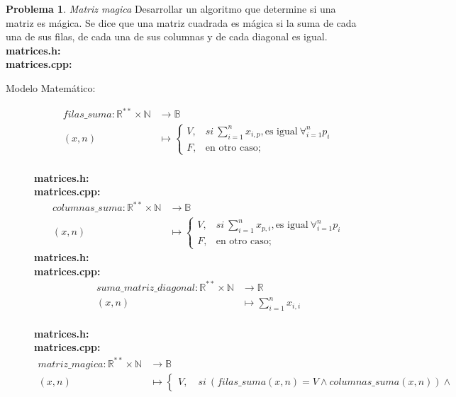 \documentclass{article}
\theoremstyle{plain}
\theoremstyle{definition}
\newtheorem{problem}{Problema}
\begin{document}
\begin{problem} \emph{Matriz magica}
Desarrollar un algoritmo que determine si una matriz es mágica. Se dice que una matriz cuadrada es mágica si la suma de cada una de sus filas, de cada una de sus columnas y de cada diagonal es igual. \\
\textbf{matrices.h:}\ \\
\textbf{matrices.cpp:}\ 
%
\begin{description}
\item[Modelo Matemático:]
%
\begin{align*}
filas\_suma: \mathbb{R}^{**}\times\mathbb{N} &\to \mathbb{B}\\
(x,n) &\mapsto 
\begin{cases}
V,& si\ \sum_{i=1}^{n} x_{i,p}, \text{es igual} \ \forall_{i=1}^{n} p_i\\
F,& \text{en otro caso;}
\end{cases}
\end{align*}\\
\textbf{matrices.h:}\ \\
\textbf{matrices.cpp:}\ \\
\begin{align*}
columnas\_suma: \mathbb{R}^{**}\times\mathbb{N} &\to \mathbb{B}\\
(x,n) &\mapsto 
\begin{cases}
V,& si\ \sum_{i=1}^{n} x_{p,i}, \text{es igual} \ \forall_{i=1}^{n} p_i\\
F,& \text{en otro caso;}
\end{cases}
\end{align*}
\textbf{matrices.h:}\ \\
\textbf{matrices.cpp:}\ \\
\begin{align*}
suma\_matriz\_diagonal: \mathbb{R}^{**}\times\mathbb{N} &\to \mathbb{R}\\
(x,n) &\mapsto \sum_{i=1}^{n} x_{i,i}
\end{align*}\\
\textbf{matrices.h:}\ \\
\textbf{matrices.cpp:}\ \\
\begin{align*}
matriz\_magica: \mathbb{R}^{**}\times\mathbb{N} &\to \mathbb{B}\\
(x,n) &\mapsto 
\begin{cases}
V,\quad si\ (filas\_suma(x,n)=V \wedge columnas\_suma(x,n)) \wedge

\end{cases}
\end{align*}
\end{description}
\end{problem}
\end{document}
